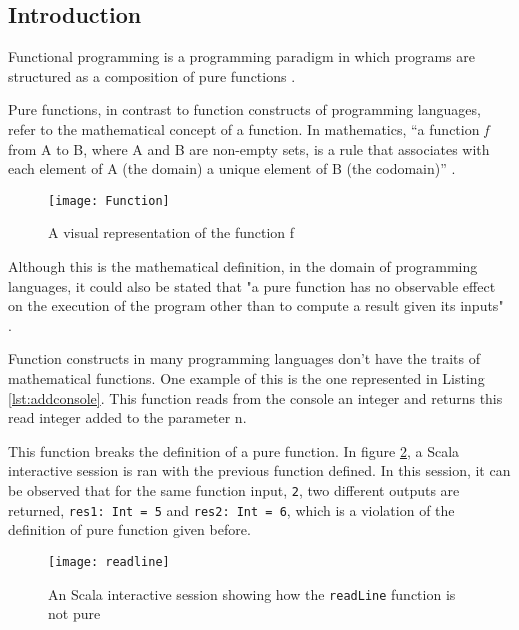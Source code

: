\documentclass[../main.tex]{subfiles}
\begin{document}
\subsection{Introduction} Functional programming is a programming paradigm in
which programs are structured as a composition of pure functions
\autocite{Hughes1989WhyMatters}.

Pure functions, in contrast to function constructs of programming languages,
refer to the mathematical concept of a function. In mathematics, ``a function \textit{f}
from A to B, where A and B are non-empty sets, is a rule that associates with
each element of A (the domain) a unique element of B (the codomain)''
\autocite{NicholsonTheMathematics}.

\begin{figure}[ht]
  \centering \texttt{[image: Function]}
  \caption{\label{fig:label} A visual representation of the function f}
\end{figure}


Although this is the mathematical definition, in the domain of programming
languages, it could also be stated that "a pure function has no observable effect
on the execution of the program other than to compute a result given its inputs"
\autocite{Chiusano2013FunctionalScala}.

Function constructs in many programming languages don't have the
traits of mathematical functions. One example of this is the one represented in
Listing \ref{lst:addconsole}. This function reads from the console an integer
and returns this read integer added to the parameter n.



This function breaks the definition of a pure function. In figure
\ref{fig:readLineN}, a Scala interactive session is ran with the previous
function defined. In this session, it can be observed that for the same function input,
\texttt{2}, two different outputs are returned, \texttt{res1: Int = 5} and \texttt{res2:
  Int = 6}, which is a violation of the definition of pure function given before.

\begin{figure}[ht]
  \centering \texttt{[image: readline]}
  \caption{\label{fig:readLineN} An Scala interactive session showing how the
    \texttt{readLine} function is not pure}
\end{figure}
\end{document}
